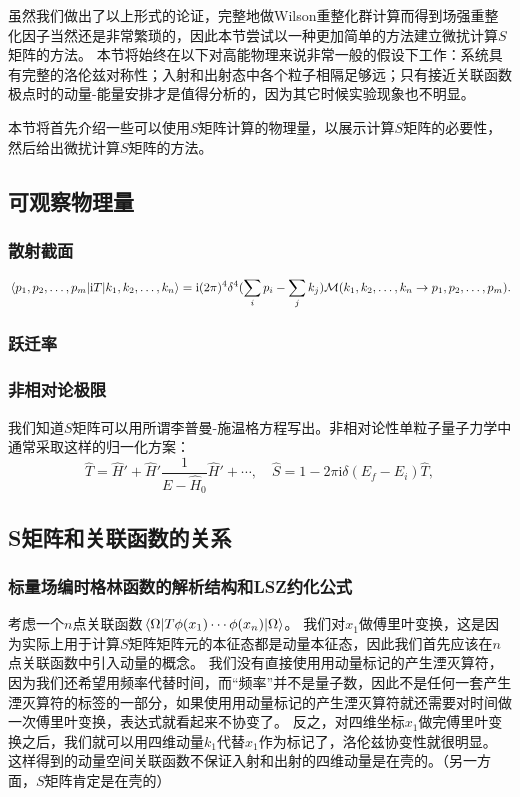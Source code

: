 \documentclass[hyperref, UTF8, a4paper]{ctexart}
\newcommand*{\ii}{\mathrm{i}}
\begin{document}
虽然我们做出了以上形式的论证，完整地做Wilson重整化群计算而得到场强重整化因子当然还是非常繁琐的，因此本节尝试以一种更加简单的方法建立微扰计算$S$矩阵的方法。
本节将始终在以下对高能物理来说非常一般的假设下工作：系统具有完整的洛伦兹对称性；入射和出射态中各个粒子相隔足够远；只有接近关联函数极点时的动量-能量安排才是值得分析的，因为其它时候实验现象也不明显。

本节将首先介绍一些可以使用$S$矩阵计算的物理量，以展示计算$S$矩阵的必要性，然后给出微扰计算$S$矩阵的方法。

\subsection{可观察物理量}

\subsubsection{散射截面}

\begin{equation}
    \mel*{p_1, p_2, \ldots, p_m}{\ii T}{k_1, k_2, \ldots, k_n} = \ii (2\pi)^4 \delta^4(\sum_i p_i - \sum_j k_j) \mathcal{M}(k_1, k_2, \ldots, k_n \to p_1, p_2, \ldots, p_m).
\end{equation}

\subsubsection{跃迁率}

\subsubsection{非相对论极限}

我们知道$S$矩阵可以用所谓李普曼-施温格方程写出。非相对论性单粒子量子力学中通常采取这样的归一化方案：
\[
    \hat{T} = \hat{H}' + \hat{H}' \frac{1}{E - \hat{H}_0} \hat{H}' + \cdots, \quad \hat{S} = 1 - 2 \pi \ii \delta(E_f - E_i) \hat{T},
\]

\subsection{S矩阵和关联函数的关系}

\subsubsection{标量场编时格林函数的解析结构和LSZ约化公式}

考虑一个$n$点关联函数$\mel{\Omega}{T \phi(x_1) \cdots \phi(x_n)}{\Omega}$。
我们对$x_1$做傅里叶变换，这是因为实际上用于计算$S$矩阵矩阵元的本征态都是动量本征态，因此我们首先应该在$n$点关联函数中引入动量的概念。
我们没有直接使用用动量标记的产生湮灭算符，因为我们还希望用频率代替时间，而“频率”并不是量子数，因此不是任何一套产生湮灭算符的标签的一部分，如果使用用动量标记的产生湮灭算符就还需要对时间做一次傅里叶变换，表达式就看起来不协变了。
反之，对四维坐标$x_1$做完傅里叶变换之后，我们就可以用四维动量$k_1$代替$x_1$作为标记了，洛伦兹协变性就很明显。
这样得到的动量空间关联函数不保证入射和出射的四维动量是在壳的。（另一方面，$S$矩阵肯定是在壳的）
\end{document}
